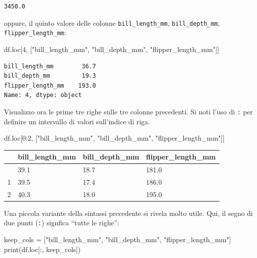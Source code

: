 \documentclass[
  letterpaper,
  krantz2]{{[}./krantz{]}}
\newenvironment{Shaded}{\begin{snugshade}}{\end{snugshade}}
\newcommand{\BuiltInTok}[1]{\textcolor[rgb]{0.00,0.23,0.31}{#1}}
\newcommand{\DecValTok}[1]{\textcolor[rgb]{0.68,0.00,0.00}{#1}}
\newcommand{\NormalTok}[1]{\textcolor[rgb]{0.00,0.23,0.31}{#1}}
\newcommand{\OperatorTok}[1]{\textcolor[rgb]{0.37,0.37,0.37}{#1}}
\newcommand{\StringTok}[1]{\textcolor[rgb]{0.13,0.47,0.30}{#1}}
\begin{document}
\begin{verbatim}
3450.0
\end{verbatim}

oppure, il quinto valore delle colonne \texttt{bill\_length\_mm},
\texttt{bill\_depth\_mm}, \texttt{flipper\_length\_mm}:

\begin{Shaded}
\begin{Highlighting}[]
\NormalTok{df.loc[}\DecValTok{4}\NormalTok{, [}\StringTok{"bill\_length\_mm"}\NormalTok{, }\StringTok{"bill\_depth\_mm"}\NormalTok{, }\StringTok{"flipper\_length\_mm"}\NormalTok{]]}
\end{Highlighting}
\end{Shaded}

\begin{verbatim}
bill_length_mm        36.7
bill_depth_mm         19.3
flipper_length_mm    193.0
Name: 4, dtype: object
\end{verbatim}

Visualizzo ora le prime tre righe sulle tre colonne precedenti. Si noti
l'uso di \texttt{:} per definire un intervallo di valori sull'indice di
riga.

\begin{Shaded}
\begin{Highlighting}[]
\NormalTok{df.loc[}\DecValTok{0}\NormalTok{:}\DecValTok{2}\NormalTok{, [}\StringTok{"bill\_length\_mm"}\NormalTok{, }\StringTok{"bill\_depth\_mm"}\NormalTok{, }\StringTok{"flipper\_length\_mm"}\NormalTok{]]}
\end{Highlighting}
\end{Shaded}

\begin{longtable}[]{@{}llll@{}}
\toprule\noalign{}
& bill\_length\_mm & bill\_depth\_mm & flipper\_length\_mm \\
\midrule\noalign{}
\endhead
\bottomrule\noalign{}
\endlastfoot
0 & 39.1 & 18.7 & 181.0 \\
1 & 39.5 & 17.4 & 186.0 \\
2 & 40.3 & 18.0 & 195.0 \\
\end{longtable}

Una piccola variante della sintassi precedente si rivela molto utile.
Qui, il segno di due punti (\texttt{:}) signfica ``tutte le righe'':

\begin{Shaded}
\begin{Highlighting}[]
\NormalTok{keep\_cols }\OperatorTok{=}\NormalTok{ [}\StringTok{"bill\_length\_mm"}\NormalTok{, }\StringTok{"bill\_depth\_mm"}\NormalTok{, }\StringTok{"flipper\_length\_mm"}\NormalTok{]}
\BuiltInTok{print}\NormalTok{(df.loc[:, keep\_cols])}
\end{Highlighting}
\end{Shaded}
\end{document}
